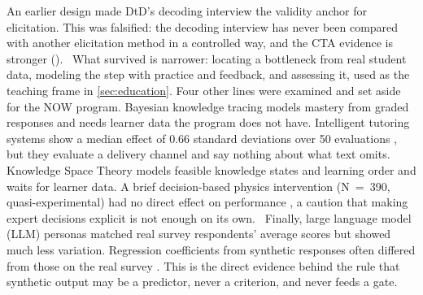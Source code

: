 An earlier design made DtD's decoding interview the validity anchor for
elicitation. This was falsified: the decoding interview has never been
compared with another elicitation method in a controlled way, and the CTA
evidence is stronger ().
\evint\ What survived is narrower: locating a bottleneck from real student
data, modeling the step with practice and feedback, and assessing it, used as
the teaching frame in \cref{sec:education}. Four other lines were examined
and set aside for the NOW program. Bayesian knowledge tracing models mastery
from graded responses \parencite{corbett1995knowledge} and needs learner data
the program does not have. Intelligent tutoring systems show a median effect
of 0.66 standard deviations over 50 evaluations
\parencite{kulik2016effectiveness}, but they evaluate a delivery channel and
say nothing about what text omits. Knowledge Space Theory models feasible
knowledge states and learning order \parencite{doignon1985spaces} and waits
for learner data. A brief decision-based physics intervention (N~=~390,
quasi-experimental) had no direct effect on performance
\parencite{jeong2024effects}, a caution that making expert decisions explicit
is not enough on its own. \evlit\ Finally, large language model (LLM) personas matched real survey
respondents' average scores but showed much less variation. Regression
coefficients from synthetic responses often differed from those on the real
survey \parencite{bisbee2024synthetic}. This is the direct evidence behind
the rule that synthetic output may be a predictor, never a criterion, and
never feeds a gate.

